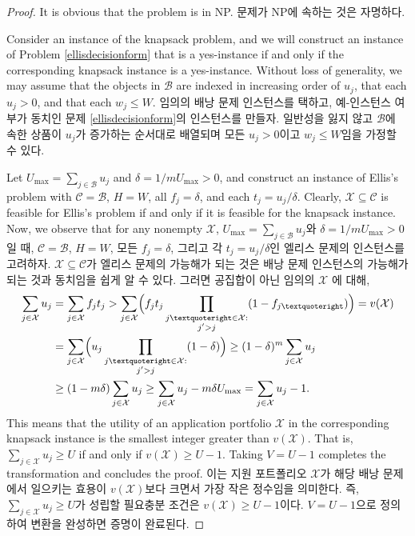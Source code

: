 \documentclass[11pt]{article} %
\theoremstyle{definition}
\theoremstyle{definition}
\begin{document}
\begin{proof}
\ifen It is obvious that the problem is in NP.
\else 문제가 NP에 속하는 것은 자명하다.\fi

\ifen
Consider an instance of the knapsack problem, and we will construct an instance of Problem \ref{ellisdecisionform} that is a yes-instance if and only if the corresponding knapsack instance is a yes-instance. Without loss of generality, we may assume that the objects in $\mathcal{B}$ are indexed in increasing order of $u_j$, that each $u_j >0$, and that each $w_j \leq W$. 
\else
임의의 배낭 문제 인스턴스를 택하고, 예-인스턴스 여부가 동치인 문제 \ref{ellisdecisionform}의 인스턴스를 만들자. 일반성을 잃지 않고 $\mathcal{B}$에 속한 상품이 $u_j$가 증가하는 순서대로 배열되며 모든 $u_j >0$이고 $w_j \leq W$임을 가정할 수 있다.
\fi

\ifen
Let $U_{\mathrm{max}} = \sum_{j \in \mathcal{B}} u_j$ and $\delta = {1} /{m U_{\mathrm{max}}} > 0$, and construct an instance of Ellis’s problem with $\mathcal{C} = \mathcal{B}$, $H = W$, all $f_j = \delta$, and each $t_j = u_j / \delta$. Clearly, $\mathcal{X} \subseteq \mathcal{C}$ is feasible for Ellis’s problem if and only if it is feasible for the knapsack instance. Now, we observe that for any nonempty $\mathcal{X}$,
\else
$U_{\mathrm{max}} = \sum_{j \in \mathcal{B}} u_j$와 $\delta = {1} /{m U_{\mathrm{max}}} > 0$일 때, $\mathcal{C} = \mathcal{B}$, $H = W$,  모든 $f_j = \delta$, 그리고 각 $t_j = u_j / \delta$인 엘리스 문제의 인스턴스를 고려하자. $\mathcal{X} \subseteq \mathcal{C}$가 엘리스 문제의 가능해가 되는 것은 배낭 문제 인스턴스의 가능해가 되는 것과 동치임을 쉽게 알 수 있다. 그러면 공집합이 아닌 임의의 $\mathcal{X}$ 에 대해,
\fi
\begin{align}
\begin{split}
\sum_{j \in \mathcal{X}} u_j &=  \sum_{j \in \mathcal{X}} f_j t_j
> \sum_{j \in \mathcal{X}} \Bigl( f_j t_j \prod_{\substack{j’ \in \mathcal{X}: \\ j' > j}} (1 - f_{j’}) \Bigr)
= v(\mathcal{X}) \\
&= \sum_{j \in \mathcal{X}} \Bigl( u_j  \prod_{\substack{j’ \in \mathcal{X}: \\ j' > j}} (1 - \delta) \Bigr)
\geq (1 - \delta)^m \sum_{j \in \mathcal{X}} u_j \\
&\geq (1 - m\delta) \sum_{j \in \mathcal{X}} u_j 
\geq \sum_{j \in \mathcal{X}} u_j  - m\delta U_{\mathrm{max}}
= \sum_{j \in \mathcal{X}} u_j  - 1.
\end{split}
\end{align}
\ifen
This means that the utility of an application portfolio $\mathcal{X}$ in the corresponding knapsack instance is the smallest integer greater than $v( \mathcal{X})$. That is, $\sum_{j \in \mathcal{X}} u_j \geq U$ if and only if $v(\mathcal{X}) \geq U -1$. Taking $V = U-1$ completes the transformation and concludes the proof. 
\else
이는 지원 포트폴리오 $\mathcal{X}$가 해당 배낭 문제에서 일으키는 효용이 $v( \mathcal{X})$보다 크면서 가장 작은 정수임을 의미한다. 즉, $\sum_{j \in \mathcal{X}} u_j \geq U$가 성립할 필요충분 조건은 $v(\mathcal{X}) \geq U -1$이다. $V = U-1$으로 정의하여 변환을 완성하면 증명이 완료된다.
\fi
\end{proof}
\end{document}

